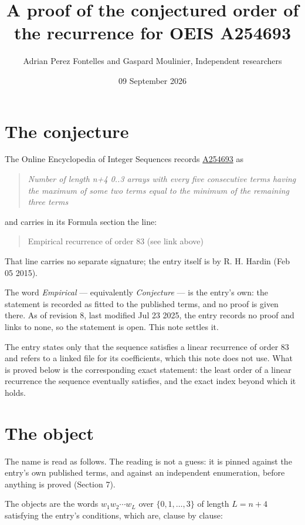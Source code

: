 \documentclass[11pt]{article}
\title{A proof of the conjectured order of the recurrence for OEIS A254693}
\author{Adrian Perez Fontelles and Gaspard Moulinier, Independent researchers}
\date{09 September 2026}
\theoremstyle{definition}
\begin{document}
\maketitle
\section{The conjecture}

The Online Encyclopedia of Integer Sequences records \href{https://oeis.org/A254693}{A254693} as

\begin{quote}\itshape Number of length n+4 0..3 arrays with every five consecutive terms having the maximum of some two terms equal to the minimum of the remaining three terms\end{quote}

and carries in its Formula section the line:

\begin{quote}\ttfamily Empirical recurrence of order 83 (see link above)\end{quote}

That line carries no separate signature; the entry itself is by R. H. Hardin (Feb 05 2015).

The word {\itshape Empirical} --- equivalently {\itshape Conjecture} --- is the entry's own: the statement is recorded as fitted to the published terms, and no proof is given there. As of revision 8, last modified Jul 23 2025, the entry records no proof and links to none, so the statement is open. This note settles it.

The entry states only that the sequence satisfies a linear recurrence of order $83$ and refers to a linked file for its coefficients, which this note does not use. What is proved below is the corresponding exact statement: the least order of a linear recurrence the sequence eventually satisfies, and the exact index beyond which it holds.

\section{The object}

The name is read as follows. The reading is not a guess: it is pinned against the entry's own published terms, and against an independent enumeration, before anything is proved (Section 7).

The objects are the words $w_1 w_2 \cdots w_L$ over $\{0,1,\dots,3\}$ of length $L = n + 4$ satisfying the entry's conditions, which are, clause by clause:
\end{document}
